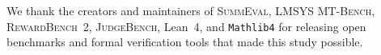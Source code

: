 \begin{ack}
We thank the creators and maintainers of \textsc{SummEval}, \textsc{LMSYS MT-Bench}, \textsc{RewardBench~2}, \textsc{JudgeBench}, Lean~4, and \texttt{Mathlib4} for releasing open benchmarks and formal verification tools that made this study possible.
\end{ack}
